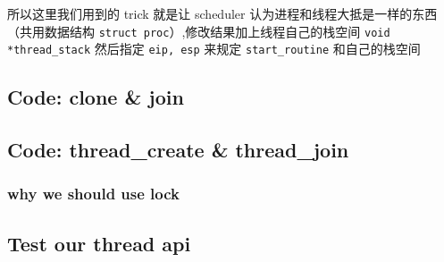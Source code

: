 所以这里我们用到的 trick 就是让 scheduler 认为进程和线程大抵是一样的东西（共用数据结构 \texttt{struct proc}）,修改结果加上线程自己的栈空间 \texttt{void *thread\_stack} 然后指定 \texttt{eip, esp} 来规定 \texttt{start\_routine} 和自己的栈空间

\subsection{Code: clone \& join}



\subsection{Code: thread\_create \& thread\_join}

\subsubsection{why we should use lock}

\subsection{Test our thread api}
